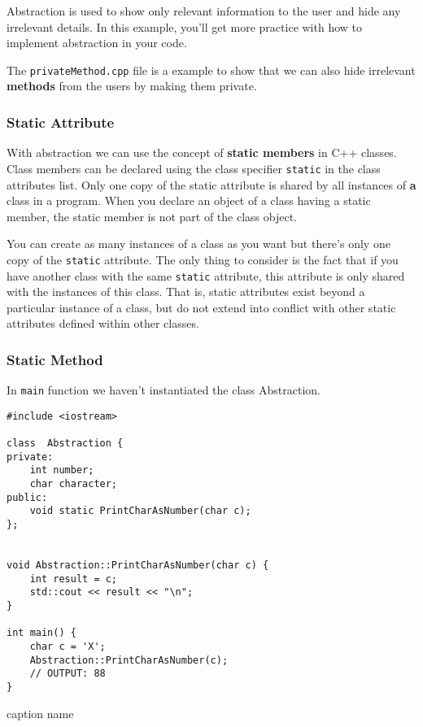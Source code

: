 \documentclass[11pt, a4paper]{article}
\begin{document}
Abstraction is used to show only relevant information to the user and hide any irrelevant details. In this example, you'll get more practice with how to implement abstraction in your code.



The \texttt{privateMethod.cpp} file is a example to show that we can also hide irrelevant \textbf{methods} from the users by making them private.

\subsubsection{Static Attribute}%
\label{ssub:static_attribute}



With abstraction we can use the concept of \textbf{static members} in C++ classes. Class members can be declared using the class specifier \texttt{static} in the class attributes list. Only one copy of the static attribute is shared by all instances of \textbf{a} class in a program. When you declare an object of a class having a static member, the static member is not part of the class object.

You can create as many instances of a class as you want but there's only one copy of the \texttt{static} attribute. 
The only thing to consider is the fact that if you have another class with the same \texttt{static} attribute, this attribute is only shared with the instances of this class. That is,  static attributes exist beyond a particular instance of a class, but do not extend into conflict with other static attributes defined within other classes.





\subsubsection{Static Method}%
\label{ssub:static_method}


In \texttt{main} function we haven't instantiated the class Abstraction. 

\begin{listing}[hbt!]
\begin{verbatim}
#include <iostream>

class  Abstraction {
private:
    int number;
    char character;
public:
    void static PrintCharAsNumber(char c);
};


void Abstraction::PrintCharAsNumber(char c) {
    int result = c;
    std::cout << result << "\n";
}

int main() {
    char c = 'X';
    Abstraction::PrintCharAsNumber(c);
    // OUTPUT: 88
}
\end{verbatim}
\caption{caption name}
\label{lst:caption_name}
\end{listing}
\end{document}
